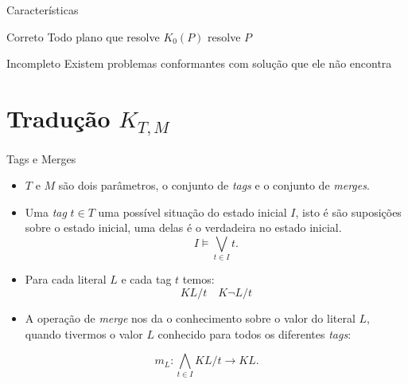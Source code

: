\begin{frame}{Características}
    \begin{exampleblock}{Correto}
        Todo plano que resolve $K_0(P)$ resolve $P$
    \end{exampleblock}
    \begin{alertblock}{Incompleto}
        Existem problemas conformantes com solução que ele não encontra
    \end{alertblock}
    
    
\end{frame}

\section{Tradução $K_{T,M}$}

\begin{frame}{Tags e Merges}
     \begin{itemize}
    \item $T$ e $M$ são dois parâmetros, o conjunto de \textit{tags} e o conjunto de \textit{merges}. 
    \item Uma \textit{tag} $t \in T$ uma possível situação do estado inicial $I$, isto é
        são suposições sobre o estado inicial, uma delas é o verdadeira no estado inicial.
        \[
            I \models \bigvee_{t \in I  } t.
        \]
    
    \item Para cada literal $L$ e cada tag $t$ temos:
    \[KL/t \quad K \lnot L/t\]
    
    \item A operação de \textit{merge} nos da o conhecimento sobre o valor do 
        literal $L$, quando tivermos o valor $L$ conhecido para todos os diferentes 
        \textit{tags}:
    \end{itemize}
        \[
            m_{L} : \bigwedge_{t \in I} KL/t \rightarrow KL.
        \]
\end{frame}

